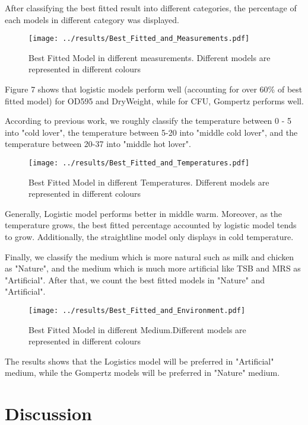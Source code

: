 \documentclass[11pt]{article}
\begin{document}
  After classifying the best fitted result into different categories, the percentage of each models in different category was displayed.
      
  \begin{figure}[H]
        \centering
        \texttt{[image: ../results/Best\_Fitted\_and\_Measurements.pdf]}
        \caption{Best Fitted Model in different measurements. Different models are represented in different colours}
  \end{figure}
  
  Figure 7 shows that logistic models perform well (accounting for over 60\% of best fitted model) for OD595 and DryWeight, while for CFU, Gompertz performs well. 
  
  
  According to previous work\cite{buckland1997model}, we roughly classify the temperature between 0 - 5 into  "cold lover", the temperature between 5-20 into "middle cold lover", and the temperature between 20-37 into "middle hot lover".
  \begin{figure}[H]
        \centering
        \texttt{[image: ../results/Best\_Fitted\_and\_Temperatures.pdf]}
        \caption{Best Fitted Model in different Temperatures. Different models are represented in different colours}
  \end{figure}
  
  Generally, Logistic model performs better in middle warm. Moreover, as the temperature grows, the best fitted percentage accounted by logistic model tends to grow. Additionally, the straightline model only displays in cold temperature.
  
  Finally, we classify the medium which is more natural such as milk and chicken as "Nature", and the medium which is much more artificial like TSB and MRS as "Artificial". After that, we count the best fitted models in "Nature" and "Artificial". 
  
  \begin{figure}[H]
        \centering
        \texttt{[image: ../results/Best\_Fitted\_and\_Environment.pdf]}
        \caption{Best Fitted Model in different Medium.Different models are represented in different colours}
  \end{figure}
  
  The results shows that the Logistics model will be preferred in "Artificial" medium, while the Gompertz models will be preferred in "Nature" medium.
  
  \section{Discussion}
  \linenumbers
  
\end{document}
